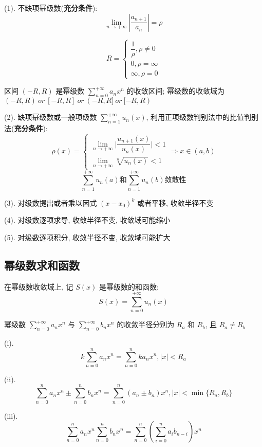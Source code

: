 \begin{theorem}[收敛域和收敛半径]
	(1). 不缺项幂级数(\textbf{充分条件}): 
	$$\lim\limits_{n\rightarrow +\infty}|\dfrac{a_{n+1}}{a_{n}}|=\rho$$
	
	$$R = \begin{cases}
		\dfrac{1}{\rho},\rho \neq 0 \\
		0,\rho = \infty            \\
		\infty,\rho = 0
	\end{cases}$$

	区间 $(-R,R)$ 是幂级数 $\sum\limits_{n=0}^{+\infty}a_{n}x^{n}$ 的收敛区间; 
	幂级数的收敛域为 $(-R,R) \ or \ [-R,R]\ or\ (-R,R] \ or\ [-R,R) $

	(2). 缺项幂级数或一般项级数 $\sum\limits_{n=1}^{+\infty}u_{n}(x)$, 利用正项级数判别法中的比值判别法(\textbf{充分条件}):
	$$\rho(x) = \begin{cases}
		\lim\limits_{n \to +\infty} \big|\dfrac{u_{n+1}(x)}{u_{n}(x)}\big| < 1\\
		\lim\limits_{n \to +\infty}\sqrt[n]{u_{n}(x)} < 1
	\end{cases}\Rightarrow
	x\in (a,b)
	$$
	$$\sum\limits_{n=1}^{+\infty}u_{n}(a)\text{和}\sum\limits_{n=1}^{+\infty}u_{n}(b) \text{敛散性}$$

	(3). 对级数提出或者乘以因式 $(x-x_{0})^{k}$ 或者平移, 收敛半径不变

	(4). 对级数逐项求导, 收敛半径不变, 收敛域可能缩小

	(5). 对级数逐项积分, 收敛半径不变, 收敛域可能扩大
\end{theorem}


\subsection{幂级数求和函数}
\begin{definition}[幂级数的和函数]
	在幂级数收敛域上, 记 $S(x)$ 是幂级数的和函数:
	$$S(x)=\sum\limits_{n=0}^{+\infty}u_{n}(x)$$
\end{definition}
\begin{theorem}[运算法则]
	幂级数 $\sum\limits_{n=0}^{+\infty}a_{n}x^{n}$ 与 $\sum\limits_{n=0}^{+\infty}b_{n}x^{n}$ 的收敛半径分别为 $R_{a}$ 和 $R_{b}$, 且 $R_{a}\neq R_{b}$

	(i). $$k \sum\limits_{n=0}^{n}a_{n}x^{n} = \sum\limits_{n=0}^{n}ka_{n}x^{n}, |x| < R_{a}$$

	(ii). $$\sum\limits_{n=0}^{n}a_{n}x^{n} \pm \sum\limits_{n=0}^{n}b_{n}x^{n} = \sum\limits_{n=0}^{n}(a_{n}\pm b_{n})x^{n}, |x| < \min\{R_{a}, R_{b}\}$$

	(iii). $$\sum\limits_{n=0}^{n}a_{n}x^{n}\sum\limits_{n=0}^{n}b_{n}x^{n} = \sum\limits_{n=0}^{n} \left(\sum\limits_{i=0}^{n}a_{i}b_{n-i}\right) x^{n}$$
\end{theorem}

